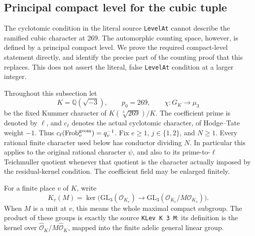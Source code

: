 \subsection{Principal compact level for the cubic tuple}
\label{sec:cubic-principal-level-counting}

The cyclotomic condition in the literal source \texttt{LevelAt} cannot
describe the ramified cubic character at 269.  The automorphic counting
space, however, is defined by a principal compact level.  We prove the
required compact-level statement directly, and identify the precise part
of the counting proof that this replaces.  This does not assert the
literal, false \texttt{LevelAt} condition at a larger integer.

Throughout this subsection let
\[
 K=\mathbb Q(\sqrt{-3}),\qquad p_0=269,\qquad
 \chi:G_K\longrightarrow\mu_3
\]
be the fixed Kummer character of \(K(\sqrt[3]{269})/K\).
The coefficient prime is denoted by \(\ell\), and \(c_\ell\) denotes
the actual cyclotomic character, of Hodge--Tate weight \(-1\).
Thus \(c_\ell(\mathrm{Frob}_v^{\rm geom})=q_v^{-1}\).
Fix \(e\geq1\), \(j\in\{1,2\}\), and \(N\geq1\).
Every rational finite character used below has conductor dividing \(N\).
In particular this applies to the original rational character \(\psi\),
and also to its prime-to-\(\ell\) Teichmuller quotient whenever that
quotient is the character actually imposed by the residual-kernel
condition.  The coefficient field may be enlarged finitely.

For a finite place \(v\) of \(K\), write
\[
 K_v(M)=\ker\bigl(\mathrm{GL}_3(\mathcal O_{K_v})
       \longrightarrow\mathrm{GL}_3(\mathcal O_{K_v}/M\mathcal O_{K_v})\bigr).
 \tag{G112.1}
\]
When \(M\) is a unit at \(v\), this means the whole maximal compact
subgroup.  The product of these groups is exactly the source
\texttt{KLev K 3 M}: its definition is the kernel over
\(\widehat{\mathcal O}_K/M\widehat{\mathcal O}_K\), mapped into the
finite adelic general linear group.

